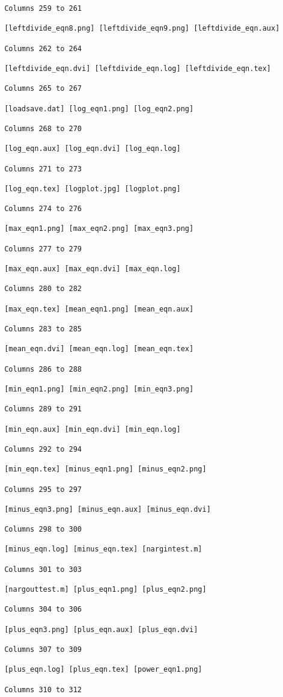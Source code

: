 \begin{verbatim}
 Columns 259 to 261

 [leftdivide_eqn8.png] [leftdivide_eqn9.png] [leftdivide_eqn.aux] 

 Columns 262 to 264

 [leftdivide_eqn.dvi] [leftdivide_eqn.log] [leftdivide_eqn.tex] 

 Columns 265 to 267

 [loadsave.dat] [log_eqn1.png] [log_eqn2.png] 

 Columns 268 to 270

 [log_eqn.aux] [log_eqn.dvi] [log_eqn.log] 

 Columns 271 to 273

 [log_eqn.tex] [logplot.jpg] [logplot.png] 

 Columns 274 to 276

 [max_eqn1.png] [max_eqn2.png] [max_eqn3.png] 

 Columns 277 to 279

 [max_eqn.aux] [max_eqn.dvi] [max_eqn.log] 

 Columns 280 to 282

 [max_eqn.tex] [mean_eqn1.png] [mean_eqn.aux] 

 Columns 283 to 285

 [mean_eqn.dvi] [mean_eqn.log] [mean_eqn.tex] 

 Columns 286 to 288

 [min_eqn1.png] [min_eqn2.png] [min_eqn3.png] 

 Columns 289 to 291

 [min_eqn.aux] [min_eqn.dvi] [min_eqn.log] 

 Columns 292 to 294

 [min_eqn.tex] [minus_eqn1.png] [minus_eqn2.png] 

 Columns 295 to 297

 [minus_eqn3.png] [minus_eqn.aux] [minus_eqn.dvi] 

 Columns 298 to 300

 [minus_eqn.log] [minus_eqn.tex] [nargintest.m] 

 Columns 301 to 303

 [nargouttest.m] [plus_eqn1.png] [plus_eqn2.png] 

 Columns 304 to 306

 [plus_eqn3.png] [plus_eqn.aux] [plus_eqn.dvi] 

 Columns 307 to 309

 [plus_eqn.log] [plus_eqn.tex] [power_eqn1.png] 

 Columns 310 to 312


\end{verbatim}
